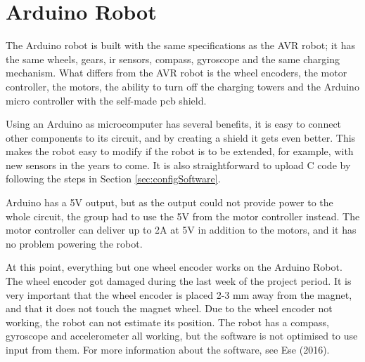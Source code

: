 \section{Arduino Robot}
The Arduino robot is built with the same specifications as the AVR robot; it has the same wheels, gears, \acrshort{ir} sensors, compass, gyroscope and the same charging mechanism. What differs from the AVR robot is the wheel encoders, the motor controller, the motors, the ability to turn off the charging towers and the Arduino micro controller with the self-made \acrshort{pcb} shield. 

Using an Arduino as microcomputer has several benefits, it is easy to connect other components to its circuit, and by creating a shield it gets even better. This makes the robot easy to modify if the robot is to be extended, for example, with new sensors in the years to come. It is also straightforward to upload C code by following the steps in Section \ref{sec:configSoftware}. 

Arduino has a 5V output, but as the output could not provide power to the whole circuit, the group had to use the 5V from the motor controller instead. The motor controller can deliver up to 2A at 5V in addition to the motors, and it has no problem powering the robot.

At this point, everything but one wheel encoder works on the Arduino Robot. The wheel encoder got damaged during the last week of the project period. It is very important that the wheel encoder is placed 2-3 mm away from the magnet, and that it does not touch the magnet wheel. Due to the wheel encoder not working, the robot can not estimate its position. The robot has a compass, gyroscope and accelerometer all working, but the software is not optimised to use input from them. For more information about the software, see Ese (2016).